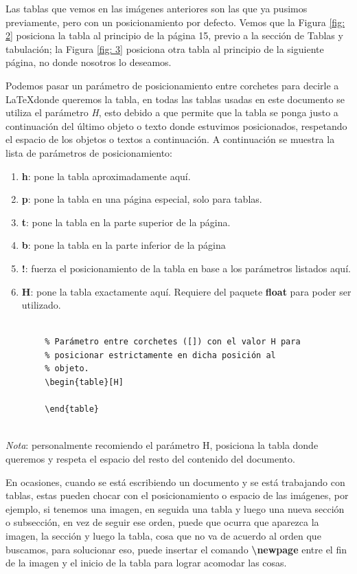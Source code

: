 Las tablas que vemos en las imágenes anteriores son las que ya pusimos previamente, pero con un posicionamiento por defecto. Vemos que la Figura \ref{fig: 2} posiciona la tabla al principio de la página 15, previo a la sección de Tablas y tabulación; la Figura \ref{fig: 3} posiciona otra tabla al principio de la siguiente página, no donde nosotros lo deseamos.

Podemos pasar un parámetro de posicionamiento entre corchetes para decirle a \LaTeX donde queremos la tabla, en todas las tablas usadas en este documento se utiliza el parámetro \textit{H}, esto debido a que permite que la tabla se ponga justo a continuación del último objeto o texto donde estuvimos posicionados, respetando el espacio de los objetos o textos a continuación. A continuación se muestra la lista de parámetros de posicionamiento:
\begin{enumerate}
    \item \textbf{h}: pone la tabla aproximadamente aquí.
    \item \textbf{p}: pone la tabla en una página especial, solo para tablas.
    \item \textbf{t}: pone la tabla en la parte superior de la página.
    \item \textbf{b}: pone la tabla en la parte inferior de la página
    \item \textbf{!}: fuerza el posicionamiento de la tabla en base a los parámetros listados aquí.
    \item \textbf{H}: pone la tabla exactamente aquí. Requiere del paquete \textbf{float} para poder ser utilizado.
\end{enumerate}
\begin{lstlisting}
    
        % Parámetro entre corchetes ([]) con el valor H para
        % posicionar estrictamente en dicha posición al
        % objeto.
        \begin{table}[H]
        
        \end{table}
    
\end{lstlisting}

\textit{Nota}: personalmente recomiendo el parámetro H, posiciona la tabla donde queremos y respeta el espacio del resto del contenido del documento.

En ocasiones, cuando se está escribiendo un documento y se está trabajando con tablas, estas pueden chocar con el posicionamiento o espacio de las imágenes, por ejemplo, si tenemos una imagen, en seguida una tabla y luego una nueva sección o subsección, en vez de seguir ese orden, puede que ocurra que aparezca la imagen, la sección y luego la tabla, cosa que no va de acuerdo al orden que buscamos, para solucionar eso, puede insertar el comando \textbf{\textbackslash{newpage}} entre el fin de la imagen y el inicio de la tabla para lograr acomodar las cosas.


